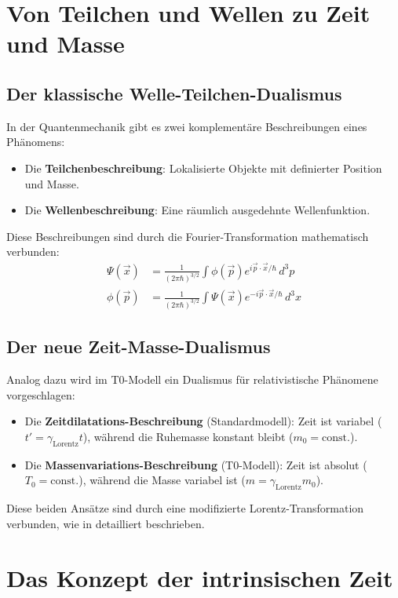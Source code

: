 \documentclass[a4paper,12pt]{article}
\newcommand{\Tzero}{T_0}
\newcommand{\vecx}{\vec{x}}
\newcommand{\gammaf}{\gamma_{\text{Lorentz}}}
\begin{document}
	\section{Von Teilchen und Wellen zu Zeit und Masse}
	
	\subsection{Der klassische Welle-Teilchen-Dualismus}
	
	In der Quantenmechanik gibt es zwei komplementäre Beschreibungen eines Phänomens:
	\begin{itemize}
		\item Die \textbf{Teilchenbeschreibung}: Lokalisierte Objekte mit definierter Position und Masse.
		\item Die \textbf{Wellenbeschreibung}: Eine räumlich ausgedehnte Wellenfunktion.
	\end{itemize}
	
	Diese Beschreibungen sind durch die Fourier-Transformation mathematisch verbunden:
	\begin{align}
		\Psi(\vecx) &= \frac{1}{(2\pi\hbar)^{3/2}} \int \phi(\vec{p}) e^{i\vec{p}\cdot\vecx/\hbar} \, d^3p \\
		\phi(\vec{p}) &= \frac{1}{(2\pi\hbar)^{3/2}} \int \Psi(\vecx) e^{-i\vec{p}\cdot\vecx/\hbar} \, d^3x
	\end{align}
	
	\subsection{Der neue Zeit-Masse-Dualismus}
	
	Analog dazu wird im T0-Modell ein Dualismus für relativistische Phänomene vorgeschlagen:
	\begin{itemize}
		\item Die \textbf{Zeitdilatations-Beschreibung} (Standardmodell): Zeit ist variabel (\( t' = \gammaf t \)), während die Ruhemasse konstant bleibt (\( m_0 = \text{const.} \)).
		\item Die \textbf{Massenvariations-Beschreibung} (T0-Modell): Zeit ist absolut (\( \Tzero = \text{const.} \)), während die Masse variabel ist (\( m = \gammaf m_0 \)).
	\end{itemize}
	
	Diese beiden Ansätze sind durch eine modifizierte Lorentz-Transformation verbunden, wie in \cite{pascher_params_2025} detailliert beschrieben.
	
	\section{Das Konzept der intrinsischen Zeit}
	
\end{document}
